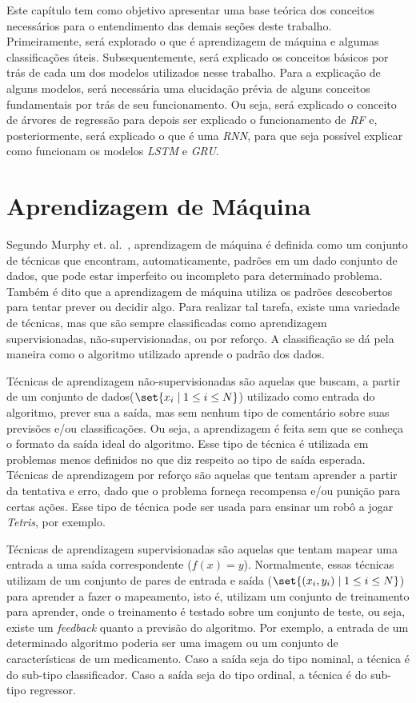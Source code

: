 Este capítulo tem como objetivo apresentar uma base teórica dos conceitos necessários para o entendimento das demais seções deste trabalho. Primeiramente, será explorado o que é aprendizagem de máquina e algumas classificações úteis. Subsequentemente, será explicado os conceitos básicos por trás de cada um dos modelos utilizados nesse trabalho. Para a explicação de alguns modelos, será necessária uma elucidação prévia de alguns conceitos fundamentais por trás de seu funcionamento. Ou seja, será explicado o conceito de árvores de regressão para depois ser explicado o funcionamento de \textit{\acrshort{RF}} e, posteriormente, será explicado o que é uma \textit{\acrshort{RNN}}, para que seja possível explicar como funcionam os modelos \textit{\acrshort{LSTM}} e \textit{\acrshort{GRU}}.

\section{Aprendizagem de Máquina}

Segundo Murphy et. al.~\cite{murphy2012machine}, aprendizagem de máquina é definida como um conjunto de técnicas que encontram, automaticamente, padrões em um dado conjunto de dados, que pode estar imperfeito ou incompleto para determinado problema. Também é dito que a aprendizagem de máquina utiliza os padrões descobertos para tentar prever ou decidir algo. Para realizar tal tarefa, existe uma variedade de técnicas, mas que são sempre classificadas como aprendizagem supervisionadas, não-supervisionadas, ou por reforço. A classificação se dá pela maneira como o algoritmo utilizado aprende o padrão dos dados.

Técnicas de aprendizagem não-supervisionadas são aquelas que buscam, a partir de um conjunto de dados(\(\set{x_i \mid 1\leq i\leq N}\)) utilizado como entrada do algoritmo, prever sua a saída, mas sem nenhum tipo de comentário sobre suas previsões e/ou classificações. Ou seja, a aprendizagem é feita sem que se conheça o formato da saída ideal do algoritmo. Esse tipo de técnica é utilizada em problemas menos definidos no que diz respeito ao tipo de saída esperada. Técnicas de aprendizagem por reforço são aquelas que tentam aprender a partir da tentativa e erro, dado que o problema forneça recompensa e/ou punição para certas ações. Esse tipo de técnica pode ser usada para ensinar um robô a jogar \textit{Tetris}, por exemplo.

Técnicas de aprendizagem supervisionadas são aquelas que tentam mapear uma entrada a uma saída correspondente (\(f(x) = y\)). Normalmente, essas técnicas utilizam de um conjunto de pares de entrada e saída (\(\set{(x_i, y_i) \mid 1\leq i\leq N}\)) para aprender a fazer o mapeamento, isto é, utilizam um conjunto de treinamento para aprender, onde o treinamento é testado sobre um conjunto de teste, ou seja, existe um \textit{feedback} quanto a previsão do algoritmo. Por exemplo, a entrada de um determinado algoritmo poderia ser uma imagem ou um conjunto de características de um medicamento. Caso a saída seja do tipo nominal, a técnica é do sub-tipo classificador. Caso a saída seja do tipo ordinal, a técnica é do sub-tipo regressor.

